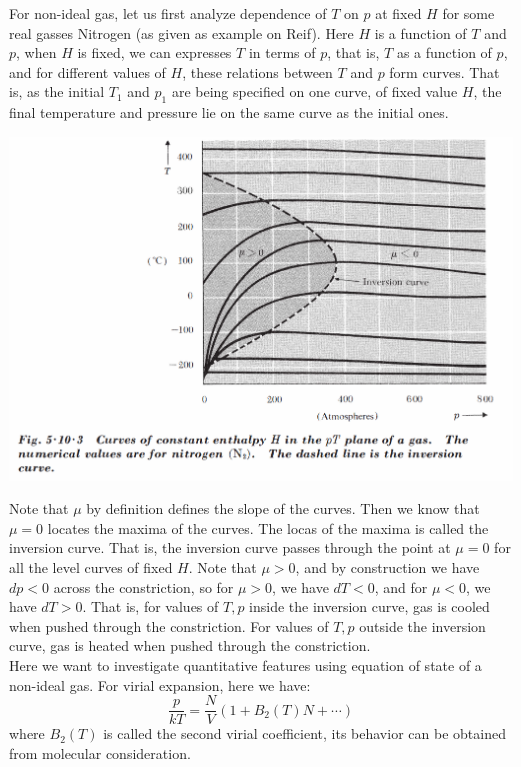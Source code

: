\documentclass[11pt,oneside]{book}
\theoremstyle{break}
\theoremstyle{break}
\begin{document}
For non-ideal gas, let us first analyze dependence of $T$ on $p$ at fixed $H$ for some real gasses Nitrogen (as given as example on Reif).
Here $H$ is a function of $T$ and $p$, when $H$ is fixed, we can expresses $T$ in terms of $p$, that is, $T$ as a function of $p$, and for different values of $H$, these relations between $T$ and $p$ form curves. That is, as the initial $T_1$ and $p_1$ are being specified on one curve, of fixed value $H$, the final temperature and pressure lie on the same curve as the initial ones. 
\begin{center}
\includegraphics[scale=0.5]{N2JoulesThomson.png}
\end{center}
Note that $\mu$ by definition defines the slope of the curves. Then we know that $\mu = 0$ locates the maxima of the curves. The locas of the maxima is called the inversion curve. That is, the inversion curve passes through the point at $\mu = 0$ for all the level curves of fixed $H$. Note that $\mu>0$, and by construction we have $dp<0$ across the constriction, so for $\mu >0$, we have $dT<0$, and for $\mu<0$, we have $dT >0$.  That is, for values of $T,p$ inside the inversion curve, gas is cooled when pushed through the constriction. For values of $T,p$ outside the inversion curve, gas is heated when pushed through the constriction.\\

Here we want to investigate quantitative features using equation of state of a non-ideal gas.
For virial expansion, here we have:
$$\frac{p}{kT} = \frac{N}{V}\left(1+ B_2(T)N+\cdots \right)$$
where $B_2(T)$ is called the second virial coefficient, its behavior can be obtained from molecular consideration. \\
\end{document}
